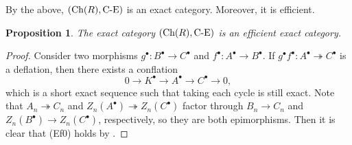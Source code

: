 \documentclass[reqno,12pt]{amsart}
\numberwithin{equation}{section}
\def\Ch{\mbox{\rm Ch}}
\theoremstyle{plain}
\newtheorem{proposition}[theorem]{\bf Proposition}
\theoremstyle{definition}
\newcommand{\CE}{\mathrm{C}\text{-}\mathrm{E}}
\begin{document}
By the above, $(\Ch(R),\text{C-E})$ is an exact category. Moreover, it is efficient.

\begin{proposition}\label{prop-1}
    The exact category $(\Ch(R),\CE)$ is an efficient exact category.
\end{proposition}
\begin{proof}
    Consider two morphisms $g^{\bullet}:B^{\bullet}\to C^{\bullet}$ and
    $f^{\bullet}:A^{\bullet}\to B^{\bullet}$. If $g^{\bullet}f^{\bullet}:
    A^{\bullet}\twoheadrightarrow C^{\bullet}$ is a deflation,
    then there exists a conflation $$0\to K^{\bullet}\to A^{\bullet}\to C^{\bullet}\to 0,$$
    which is a short exact sequence such that taking each cycle is still exact.
    Note that $A_n\twoheadrightarrow C_n$ and $Z_n(A^{\bullet})\twoheadrightarrow Z_n(C^{\bullet})$
    factor through $B_n\to C_n$ and $Z_n(B^{\bullet})\to Z_n(C^{\bullet})$, respectively,
    so they are both epimorphisms.
    Then it is clear that {\rm (Ef0)} holds by \cite[Proposition 7.6]{B10}.


\end{proof}
\end{document}
